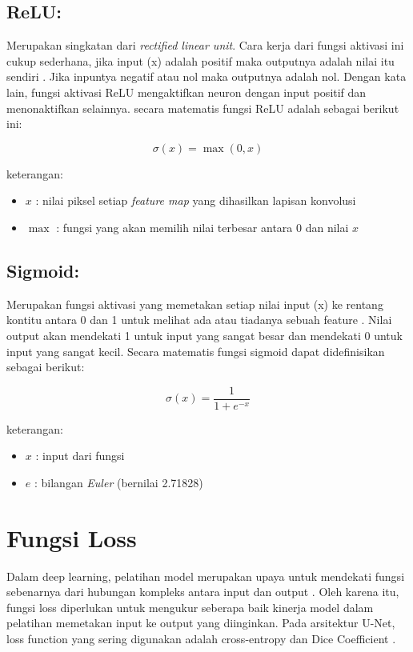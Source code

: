 \subsection{ReLU:}
Merupakan singkatan dari \textit{rectified linear unit}. Cara kerja dari fungsi aktivasi ini cukup sederhana, jika input (x) adalah positif maka outputnya adalah nilai itu sendiri \cite{younisse_fine-tuning_2023}. Jika inpuntya negatif atau nol maka outputnya adalah nol. Dengan kata lain, fungsi aktivasi ReLU mengaktifkan neuron dengan input positif dan menonaktifkan selainnya. secara matematis fungsi ReLU adalah sebagai berikut ini: 

\begin{equation}
	\sigma(x) = \max(0, x)
\end{equation}

\noindent
keterangan:
\begin{itemize}
	\item $x$ : nilai piksel setiap \textit{feature map} yang dihasilkan lapisan konvolusi
	\item $\max$ : fungsi yang akan memilih nilai terbesar antara 0 dan nilai $x$
\end{itemize}

\subsection{Sigmoid:}
Merupakan fungsi aktivasi yang memetakan setiap nilai input (x) ke rentang kontitu antara 0 dan 1 untuk melihat ada atau tiadanya sebuah feature \cite{younisse_fine-tuning_2023}. Nilai output akan mendekati 1 untuk input yang sangat besar dan mendekati 0 untuk input yang sangat kecil. Secara matematis fungsi sigmoid dapat didefinisikan sebagai berikut:

\begin{equation}
	\sigma(x) = \frac{1}{1 + e^{-x}}
\end{equation}

\noindent
keterangan:
\begin{itemize}
	\item $x$ : input dari fungsi
	\item $e$ : bilangan \textit{Euler} (bernilai 2.71828)
\end{itemize}


\section{Fungsi Loss}

\noindent Dalam deep learning, pelatihan model merupakan upaya untuk mendekati fungsi sebenarnya dari hubungan kompleks antara input dan output \cite{dawani_hands-mathematics_2020}. Oleh karena itu, fungsi loss diperlukan untuk mengukur seberapa baik kinerja model dalam pelatihan memetakan input ke output yang diinginkan. Pada arsitektur U-Net, loss function yang sering digunakan adalah cross-entropy dan Dice Coefficient \cite{huang_fully_2022}.  

